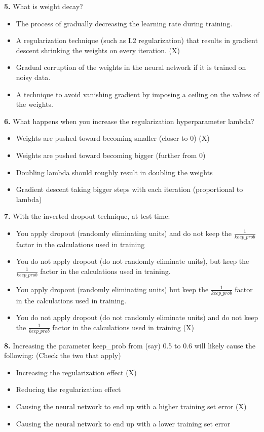 \textbf{5.} What is weight decay?
\begin{itemize}
    \item The process of gradually decreasing the learning rate during training.
    \item A regularization technique (such as L2 regularization) that results in gradient descent shrinking the weights on every iteration. (X)
    \item Gradual corruption of the weights in the neural network if it is trained on noisy data.
    \item A technique to avoid vanishing gradient by imposing a ceiling on the values of the weights.
\end{itemize}
\textbf{6.} What happens when you increase the regularization hyperparameter lambda?
\begin{itemize}
    \item Weights are pushed toward becoming smaller (closer to 0) (X)
    \item Weights are pushed toward becoming bigger (further from 0)
    \item Doubling lambda should roughly result in doubling the weights
    \item Gradient descent taking bigger steps with each iteration (proportional to lambda)
\end{itemize}
\textbf{7.} With the inverted dropout technique, at test time:
\begin{itemize}
    \item You apply dropout (randomly eliminating units) and do not keep the $\frac{1}{keep\_prob}$ factor in the calculations used in training
    \item You do not apply dropout (do not randomly eliminate units), but keep the $\frac{1}{keep\_prob}$ factor in the calculations used in training.
    \item You apply dropout (randomly eliminating units) but keep the $\frac{1}{keep\_prob}$ factor in the calculations used in training.
    \item You do not apply dropout (do not randomly eliminate units) and do not keep the $\frac{1}{keep\_prob}$ factor in the calculations used in training (X)
\end{itemize}
\textbf{8.} Increasing the parameter keep\_prob from (say) 0.5 to 0.6 will likely cause the following: (Check the two that apply)
\begin{itemize}
    \item Increasing the regularization effect (X)
    \item Reducing the regularization effect
    \item Causing the neural network to end up with a higher training set error (X)
    \item Causing the neural network to end up with a lower training set error
\end{itemize}
